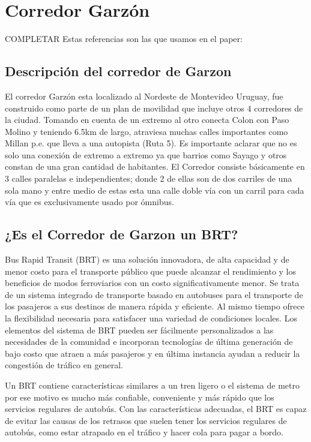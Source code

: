 \section{Corredor Garzón}
COMPLETAR
Estas referencias son las que usamos en el paper:
\citep{olivera2013}
\citep{olivera2015}	


\subsection{Descripción del corredor de Garzon}	
El corredor Garzón esta localizado al Nordeste de Montevideo Uruguay, fue construido como parte de un plan de movilidad que incluye otros 4 corredores de la ciudad. Tomando en cuenta de un extremo al otro conecta Colon con Paso Molino y teniendo 6.5km de largo, atraviesa muchas calles importantes como Millan p.e. que lleva a una autopista (Ruta 5). Es importante aclarar que no es solo una conexión de extremo a extremo ya que barrios como Sayago y otros constan de una gran cantidad de habitantes.
El Corredor consiste básicamente en 3 calles paralelas e independientes; donde 2 de ellas son de dos carriles de una sola mano y entre medio de estas esta una calle doble vía con un carril para cada vía que es exclusivamente usado por ómnibus.

\subsection{¿Es el Corredor de Garzon un BRT?}
Bus Rapid Transit (BRT) es una solución innovadora, de alta capacidad y de menor costo para el transporte público que puede alcanzar el rendimiento y los beneficios de modos ferroviarios con un costo significativamente menor. Se trata de un sistema integrado de transporte basado en autobuses para el transporte de los pasajeros a sus destinos de manera rápida y eficiente. Al mismo tiempo ofrece la flexibilidad necesaria para satisfacer una variedad de condiciones locales. Los elementos del sistema de BRT pueden ser fácilmente personalizados a las necesidades de la comunidad e incorporan tecnologías de última generación de bajo costo que atraen a más pasajeros y en última instancia ayudan a reducir la congestión de tráfico en general.

Un BRT contiene características similares a un tren ligero o el sistema de metro por ese motivo es mucho más confiable, conveniente y más rápido que los servicios regulares de autobús. Con las características adecuadas, el BRT es capaz de evitar las causas de los retrasos que suelen tener los servicios regulares de autobús, como estar atrapado en el tráfico y hacer cola para pagar a bordo.

